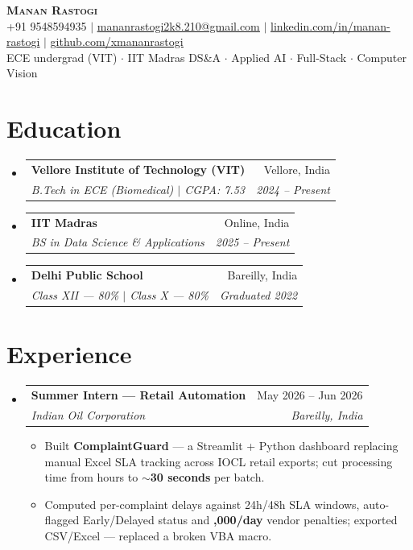 \documentclass[letterpaper,11pt]{article}
\makeatletter
\newcommand{\resumeItem}[1]{
  \item\small{
    {#1 \vspace{-2pt}}
  }
}
\newcommand{\resumeSubheading}[4]{
  \vspace{-2pt}\item
    \begin{tabular*}{0.97\textwidth}[t]{l@{\extracolsep{\fill}}r}
      \textbf{#1} & #2 \\
      \textit{\small#3} & \textit{\small #4} \\
    \end{tabular*}\vspace{-7pt}
}
\newcommand{\resumeSubHeadingListStart}{\begin{itemize}[leftmargin=0.15in, label={}]}
\newcommand{\resumeSubHeadingListEnd}{\end{itemize}}
\newcommand{\resumeItemListStart}{\begin{itemize}}
\newcommand{\resumeItemListEnd}{\end{itemize}\vspace{-5pt}}
\makeatother
\begin{document}
\begin{center}
    \textbf{\Huge \scshape Manan Rastogi} \\ \vspace{2pt}
    \small +91 9548594935 $|$ \href{mailto:mananrastogi2k8.210@gmail.com}{\underline{mananrastogi2k8.210@gmail.com}} $|$
    \href{https://linkedin.com/in/manan-rastogi-402697288}{\underline{linkedin.com/in/manan-rastogi}} $|$
    \href{https://github.com/xmananrastogi}{\underline{github.com/xmananrastogi}} \\ \vspace{1pt}
    \small ECE undergrad (VIT) $\cdot$ IIT Madras DS\&A $\cdot$ Applied AI $\cdot$ Full-Stack $\cdot$ Computer Vision
\end{center}

\section{Education}
  \resumeSubHeadingListStart
    \resumeSubheading
      {Vellore Institute of Technology (VIT)}{Vellore, India}
      {B.Tech in ECE (Biomedical) $|$ CGPA: 7.53}{2024 -- Present}
    \resumeSubheading
      {IIT Madras}{Online, India}
      {BS in Data Science \& Applications}{2025 -- Present}
    \resumeSubheading
      {Delhi Public School}{Bareilly, India}
      {Class XII — 80\% $|$ Class X — 80\%}{Graduated 2022}
  \resumeSubHeadingListEnd

\section{Experience}
  \resumeSubHeadingListStart
    \resumeSubheading
      {Summer Intern — Retail Automation}{May 2026 -- Jun 2026}
      {Indian Oil Corporation}{Bareilly, India}
      \resumeItemListStart
        \resumeItem{Built \textbf{ComplaintGuard} — a Streamlit + Python dashboard replacing manual Excel SLA tracking across IOCL retail exports; cut processing time from hours to \textbf{$\sim$30 seconds} per batch.}
        \resumeItem{Computed per-complaint delays against 24h/48h SLA windows, auto-flagged Early/Delayed status and \textbf{\rupee1,000/day} vendor penalties; exported CSV/Excel — replaced a broken VBA macro.}
      \resumeItemListEnd
  \resumeSubHeadingListEnd

\end{document}
